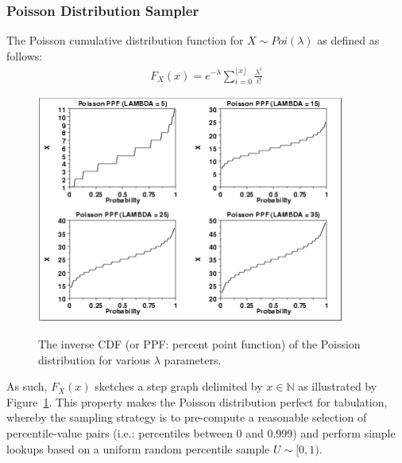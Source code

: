 \subsubsection{Poisson Distribution Sampler}

The Poisson cumulative distribution function for $X \sim Poi(\lambda)$ as defined as follows:
\begin{align*}
    F_X(x) = e^{-\lambda} \sum_{i=0}^{\lfloor x \rfloor} \frac{\lambda^i}{i!}
\end{align*}

\begin{figure}[!h]
    \includegraphics[width=0.9\textwidth]{images/chapter_3_design/poisson_percent_point_function}
    \centering~\caption{The inverse CDF (or PPF: percent point function) of the Poission distribution for various
        $\lambda$ parameters\cite{engineering_statistics_handbook_poisson_distribution}.}
    \label{fig:chapter_3_design-poisson_percent_point_function}
\end{figure}

As such, $F_X(x)$ sketches a step graph delimited by $x \in \mathbb{N}$ as illustrated by
Figure~\ref{fig:chapter_3_design-poisson_percent_point_function}. This property makes the Poisson distribution
perfect for tabulation, whereby the sampling strategy is to pre-compute a reasonable selection of percentile-value
pairs (i.e.: percentiles between 0 and 0.999) and perform simple lookups based on a uniform random percentile sample
$U \sim [0, 1)$.

\newpage

